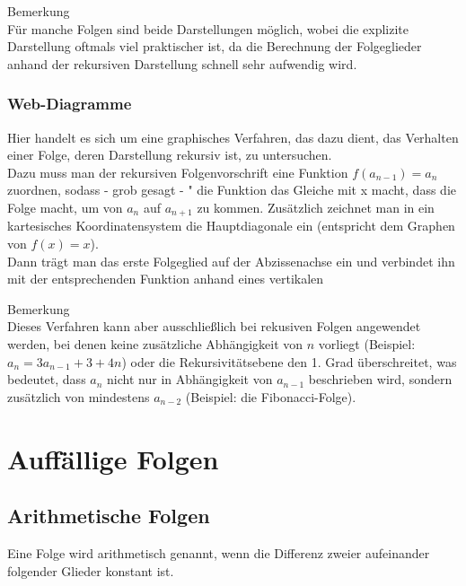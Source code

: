 \begin{Bemerkung}
Bemerkung\\
Für manche Folgen sind beide Darstellungen möglich, wobei die explizite Darstellung oftmals viel praktischer ist, da die Berechnung der Folgeglieder anhand der rekursiven Darstellung schnell sehr aufwendig wird.
\end{Bemerkung}

\subsubsection{Web-Diagramme}
Hier handelt es sich um eine graphisches Verfahren, das dazu dient, das Verhalten einer Folge, deren Darstellung rekursiv ist, zu untersuchen.\\
Dazu muss man der rekursiven Folgenvorschrift eine Funktion $f(a_{n-1})=a_{n}$ zuordnen, sodass - grob gesagt - " die Funktion das Gleiche mit x macht, dass die Folge macht, um von $a_{n}$ auf $a_{n+1}$ zu kommen. Zusätzlich zeichnet man in ein kartesisches Koordinatensystem die Hauptdiagonale ein (entspricht dem Graphen von $f(x)=x$).\\
Dann trägt man das erste Folgeglied auf der Abzissenachse ein und verbindet ihn mit der entsprechenden Funktion anhand eines vertikalen

\begin{Bemerkung}
Bemerkung\\
Dieses Verfahren kann aber ausschließlich bei rekusiven Folgen angewendet werden, bei denen keine zusätzliche Abhängigkeit von $n$ vorliegt (Beispiel: $a_{n}=3a_{n-1}+3+4n$) oder die Rekursivitätsebene den 1. Grad überschreitet, was bedeutet, dass $a_{n}$ nicht nur in Abhängigkeit von $a_{n-1}$ beschrieben wird, sondern zusätzlich von mindestens $a_{n-2}$ (Beispiel: die Fibonacci-Folge).\\
\end{Bemerkung}



		\section{Auffällige Folgen}


	\subsection{Arithmetische Folgen}

Eine Folge wird arithmetisch genannt, wenn die Differenz zweier aufeinander folgender Glieder konstant ist.

